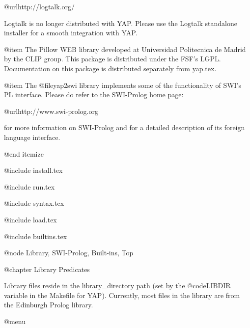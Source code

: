 @url{http://logtalk.org/}

Logtalk is no longer distributed with YAP. Please use the Logtalk standalone 
installer for a smooth integration with YAP.

@item The Pillow WEB library developed at Universidad Politecnica de
Madrid by the CLIP group. This package is distributed under the FSF's
LGPL. Documentation on this package is distributed separately from
yap.tex.

@item The @file{yap2swi} library implements some of the functionality of
SWI's PL interface. Please do refer to the SWI-Prolog home page:

@url{http://www.swi-prolog.org}

for more information on SWI-Prolog and for a detailed description of its
foreign language interface.

@end itemize

@include install.tex

@include run.tex

@include syntax.tex

@include load.tex

@include builtins.tex

@node Library, SWI-Prolog, Built-ins, Top

@chapter Library Predicates

Library files reside in the library_directory path (set by the
@code{LIBDIR} variable in the Makefile for YAP). Currently,
most files in the library are from the Edinburgh Prolog library. 

@menu
 
